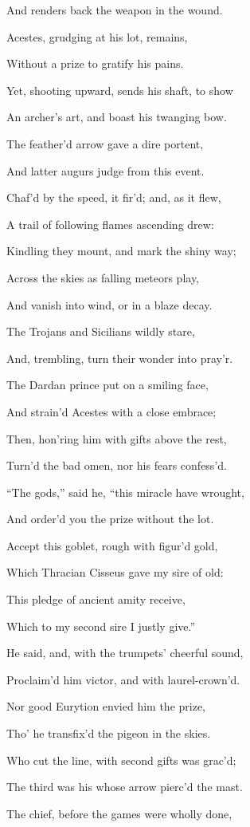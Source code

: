 And renders back the weapon in the wound.

Acestes, grudging at his lot, remains,

Without a prize to gratify his pains.

Yet, shooting upward, sends his shaft, to show

An archer’s art, and boast his twanging bow.

The feather’d arrow gave a dire portent,

And latter augurs judge from this event.

Chaf’d by the speed, it fir’d; and, as it flew,

A trail of following flames ascending drew:

Kindling they mount, and mark the shiny way;

Across the skies as falling meteors play,

And vanish into wind, or in a blaze decay.

The Trojans and Sicilians wildly stare,

And, trembling, turn their wonder into pray’r.

The Dardan prince put on a smiling face,

And strain’d Acestes with a close embrace;

Then, hon’ring him with gifts above the rest,

Turn’d the bad omen, nor his fears confess’d.

“The gods,” said he, “this miracle have wrought,

And order’d you the prize without the lot.

Accept this goblet, rough with figur’d gold,

Which Thracian Cisseus gave my sire of old:

This pledge of ancient amity receive,

Which to my second sire I justly give.”

He said, and, with the trumpets’ cheerful sound,

Proclaim’d him victor, and with laurel-crown’d.

Nor good Eurytion envied him the prize,

Tho’ he transfix’d the pigeon in the skies.

Who cut the line, with second gifts was grac’d;

The third was his whose arrow pierc’d the mast.

The chief, before the games were wholly done,

